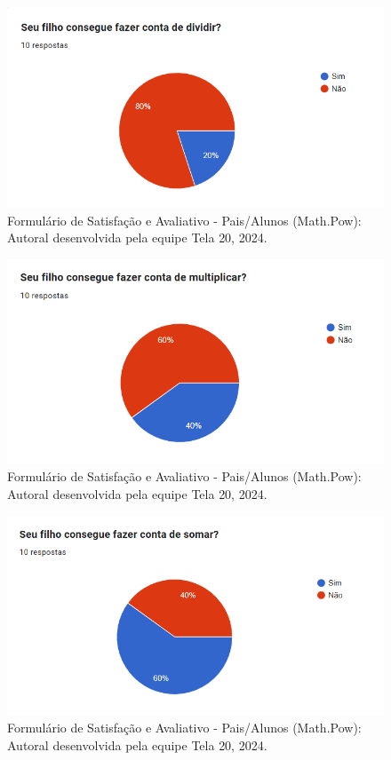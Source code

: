 \documentclass[12pt, openany, oneside, a4paper, english, brazil]{abntex2}   %
\begin{document}
\begin{figure}
    \centering
    \includegraphics{figuras/Formulário Gráficos/Pais/12 seu filho consegue fazer conta de dividir.png}
    \caption{Formulário de Satisfação e Avaliativo  - Pais/Alunos (Math.Pow):  Autoral desenvolvida pela equipe Tela 20, 2024.}
    \label{gráfico gerado pelo formulário}
\end{figure}

\begin{figure}
    \centering
    \includegraphics{figuras/Formulário Gráficos/Pais/13 seu filho consegue fazer conta de multiplicar.png}
    \caption{Formulário de Satisfação e Avaliativo  - Pais/Alunos (Math.Pow):  Autoral desenvolvida pela equipe Tela 20, 2024.}
    \label{gráfico gerado pelo formulário}
\end{figure}

\begin{figure}
    \centering
    \includegraphics{figuras/Formulário Gráficos/Pais/14 seu filho consegue fazer conta de somar.png}
    \caption{Formulário de Satisfação e Avaliativo  - Pais/Alunos (Math.Pow):  Autoral desenvolvida pela equipe Tela 20, 2024.}
    \label{gráfico gerado pelo formulário}
\end{figure}
\end{document}
